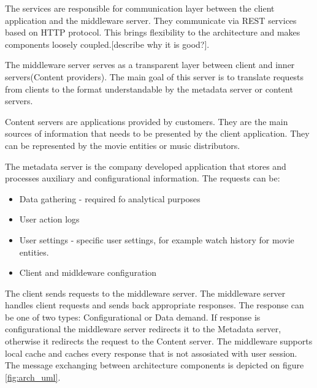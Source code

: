 The services are responsible for communication layer between the client application and the middleware server. They communicate via REST services based on HTTP protocol. This brings flexibility to the architecture and makes components loosely coupled.[describe why it is good?]. 

The middleware server serves as a transparent layer between client and inner servers(Content providers). The main goal of this server is to translate requests from clients to the format understandable by the metadata server or content servers.  

Content servers are applications provided by customers. They are the main sources of information that needs to be presented by the client application. They can be represented by the movie entities or music distributors.

The metadata server is the company developed application that stores and processes auxiliary and configurational information. The requests can be: 

\begin{itemize}
	\item Data gathering - required fo analytical purposes
	\item User action logs 
	\item User settings - specific user settings, for example watch history for movie entities.
	\item Client and midldeware configuration
\end{itemize} 

The client sends requests to the middleware server. The middleware server handles client requests and sends back appropriate responses. The response can be one of two types: Configurational or Data demand. If response is configurational the middleware server redirects it to the Metadata server, otherwise it redirects the request to the Content server. The middleware supports local cache and caches every response that is not assosiated with user session. The message exchanging between architecture components is depicted on figure \ref{fig:arch_uml}.


